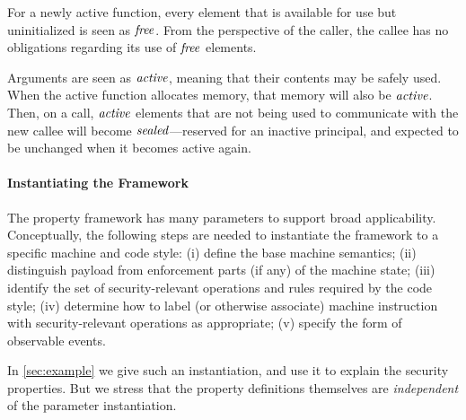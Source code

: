 \documentclass[10pt,conference]{ieeetran}%
\theoremstyle{definition}
\begin{document}
For a newly active function, every element that is available for use but uninitialized
is seen as \(\mathit{free}\). From the perspective of the caller, the callee has no obligations
regarding its use of \(\mathit{free}\) elements.

Arguments are seen as \(\mathit{active}\), meaning that their contents may be safely used.
When the active function allocates memory, that memory will also be \(\mathit{active}\).
Then, on a call, \(\mathit{active}\) elements that are not being used to communicate with
the new callee will become \(\mathit{sealed}\)---reserved for an inactive principal,
and expected to be unchanged when it becomes active again.



\paragraph*{Instantiating the Framework}

The property framework has many parameters to support broad applicability.
Conceptually, the following steps are needed to instantiate the framework to a specific machine
and code style: (i) define the base machine semantics; (ii) distinguish payload
from enforcement parts (if any) of the machine state; (iii) identify the set of
security-relevant operations and rules required by the code style; (iv) determine
how to label (or otherwise associate) machine instruction with security-relevant
operations as appropriate; (v) specify the form of observable events.

In \cref{sec:example} we give such an instantiation, and use it to explain the
security properties.  But we stress that the property definitions themselves
are \emph{independent} of the parameter instantiation. 
\end{document}

